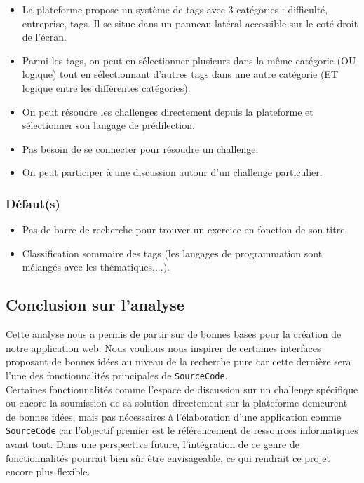 \begin{itemize}
    \item La plateforme propose un système de \glspl{tag} avec 3 catégories : difficulté, entreprise, \glspl{tag}. Il se situe dans un panneau latéral accessible sur le coté droit de l'écran.
    \item Parmi les \glspl{tag}, on peut en sélectionner plusieurs dans la même catégorie (OU logique) tout en sélectionnant d'autres \glspl{tag} dans une autre catégorie (ET logique entre les différentes catégories).
    \item On peut résoudre les challenges directement depuis la plateforme et sélectionner son langage de prédilection.
    \item Pas besoin de se connecter pour résoudre un challenge.
    \item On peut participer à une discussion autour d'un challenge particulier.
\end{itemize}

\subsubsection*{Défaut(s)}

\begin{itemize}
    \item Pas de barre de recherche pour trouver un exercice en fonction de son titre.
    \item Classification sommaire des \glspl{tag} (les langages de programmation sont mélangés avec les thématiques,...).
\end{itemize}

\subsection*{Conclusion sur l'analyse}

Cette analyse nous a permis de partir sur de bonnes bases pour la création de notre application web. Nous voulions nous inspirer de certaines interfaces proposant de bonnes idées au niveau de la recherche pure car cette dernière sera l'une des fonctionnalités principales de \texttt{SourceCode}. \\

Certaines fonctionnalités comme l'espace de discussion sur un challenge spécifique ou encore la soumission de sa solution directement sur la plateforme demeurent de bonnes idées, mais pas nécessaires à l'élaboration d'une application comme \texttt{SourceCode} car l'objectif premier est le référencement de ressources informatiques avant tout. Dans une perspective future, l'intégration de ce genre de fonctionnalités pourrait bien sûr être envisageable, ce qui rendrait ce projet encore plus flexible.\\

